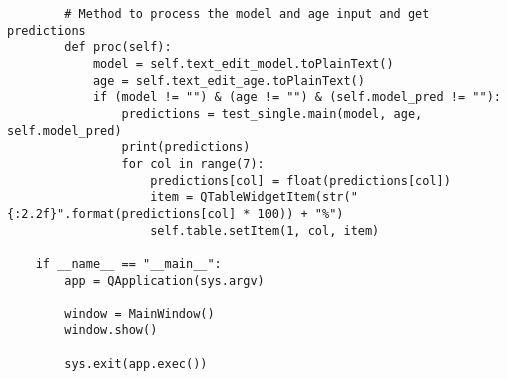\begin{lstlisting}
        # Method to process the model and age input and get predictions
        def proc(self):
            model = self.text_edit_model.toPlainText()
            age = self.text_edit_age.toPlainText()
            if (model != "") & (age != "") & (self.model_pred != ""):
                predictions = test_single.main(model, age, self.model_pred)
                print(predictions)
                for col in range(7):
                    predictions[col] = float(predictions[col])
                    item = QTableWidgetItem(str("{:2.2f}".format(predictions[col] * 100)) + "%")
                    self.table.setItem(1, col, item)

    if __name__ == "__main__":
        app = QApplication(sys.argv)
                
        window = MainWindow()
        window.show()
                
        sys.exit(app.exec()) 
\end{lstlisting}



